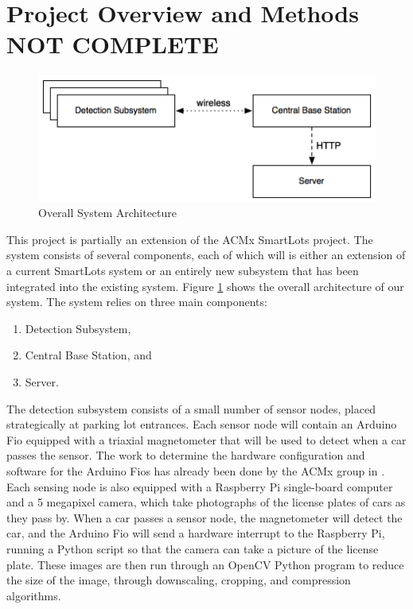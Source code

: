 \documentclass[11pt, oneside, fullpage, doublespace]{article}
\begin{document}
\section{Project Overview and Methods {\color{red}\textbf{NOT COMPLETE}} }
\begin{figure}
\begin{center}
\includegraphics[width=4.5in]{architecture}
\end{center}
\caption{Overall System Architecture}
\label{fig:system}
\end{figure}
This project is partially an extension of the ACMx SmartLots project. The system consists of several components, each of which will is either an extension of a current SmartLots system or an entirely new subsystem that has been integrated into the existing system. Figure \ref{fig:system} shows the overall architecture of our system. The system relies on three main components:
\begin{enumerate}
\item Detection Subsystem,
\item Central Base Station, and
\item Server.
\end{enumerate}

The detection subsystem consists of a small number of sensor nodes, placed strategically at parking lot entrances. Each sensor node will contain an Arduino Fio equipped with a triaxial magnetometer that will be used to detect when a car passes the sensor. The work to determine the hardware configuration and software for the Arduino Fios has already been done by the ACMx group in \cite{stillwell2013}. Each sensing node is also equipped with a Raspberry Pi single-board computer and a 5 megapixel camera, which take photographs of the license plates of cars as they pass by. When a car passes a sensor node, the magnetometer will detect the car, and the Arduino Fio will send a hardware interrupt to the Raspberry Pi, running a Python script so that the camera can take a picture of the license plate. These images are then run through an OpenCV Python program to reduce the size of the image, through downscaling, cropping, and compression algorithms.
\end{document}
